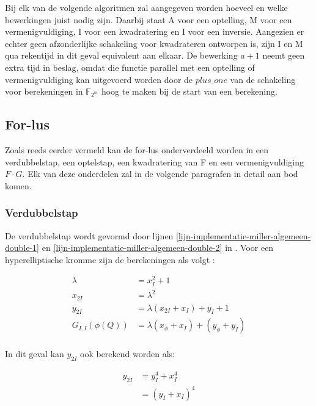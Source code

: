 Bij elk van de volgende algoritmen zal aangegeven worden hoeveel en welke bewerkingen juist nodig zijn. Daarbij staat \textsf{A} voor een optelling, \textsf{M} voor een vermenigvuldiging, \textsf{I} voor een kwadratering en \textsf{I} voor een inversie. Aangezien er echter geen afzonderlijke schakeling voor kwadrateren ontworpen is, zijn \textsf{I} en \textsf{M} qua rekentijd in dit geval equivalent aan elkaar. De bewerking $a + 1$ neemt geen extra tijd in beslag, omdat die functie parallel met een optelling of vermenigvuldiging kan uitgevoerd worden door de $plus\_one$ van de schakeling voor berekeningen in $\mathbb{F}_{2^m}$ hoog te maken bij de start van een berekening.

\subsection{For-lus\label{subsectie-implementatie-miller-forlus}}

Zoals reeds eerder vermeld kan de for-lus onderverdeeld worden in een verdubbelstap, een optelstap, een kwadratering van F en een vermenigvuldiging $F \cdot G$. Elk van deze onderdelen zal in de volgende paragrafen in detail aan bod komen.

\subsubsection{Verdubbelstap}

De verdubbelstap wordt gevormd door lijnen \ref{lijn-implementatie-miller-algemeen-double-1} en \ref{lijn-implementatie-miller-algemeen-double-2} in . Voor een hyperelliptische kromme zijn de berekeningen als volgt \cite{bertoni, hankerson-book}:

\[\begin{aligned}
	\lambda &= x_I^2 + 1\\
	x_{2I} &= \lambda ^2\\
	y_{2I} &= \lambda (x_{2I} + x_I) + y_I + 1\\
	G_{I,I}(\phi(Q)) &= \lambda (x_{\phi} + x_I) + (y_{\phi} + y_I)\\
\end{aligned}\]

In dit geval kan $y_{2I}$ ook berekend worden als:

\[\begin{aligned}
y_{2I}	&= y_I^4 + x_I^4\\
			&= (y_I + x_I)^4\\	
\end{aligned}\]

